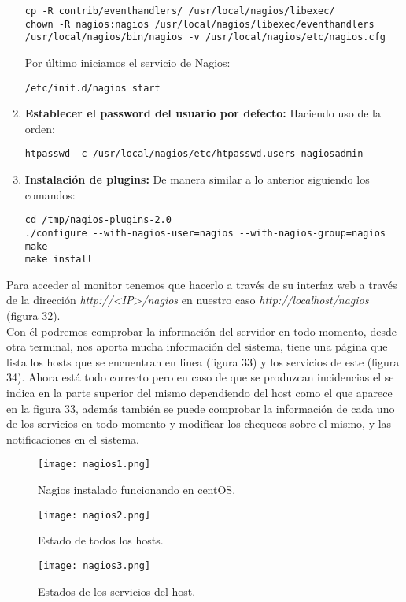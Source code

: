 \documentclass[a4paper, 11pt]{article} %
\begin{document}
\begin{enumerate}
\begin{verbatim}
cp -R contrib/eventhandlers/ /usr/local/nagios/libexec/
chown -R nagios:nagios /usr/local/nagios/libexec/eventhandlers
/usr/local/nagios/bin/nagios -v /usr/local/nagios/etc/nagios.cfg
\end{verbatim}
Por último iniciamos el servicio de Nagios:
\begin{verbatim}
/etc/init.d/nagios start
\end{verbatim}
\item \textbf{Establecer el password del usuario por defecto:} Haciendo uso de la orden:
\begin{verbatim}
htpasswd –c /usr/local/nagios/etc/htpasswd.users nagiosadmin
\end{verbatim}
\item \textbf{Instalación de plugins:} De manera similar a lo anterior siguiendo los comandos:
\begin{verbatim}
cd /tmp/nagios-plugins-2.0
./configure --with-nagios-user=nagios --with-nagios-group=nagios
make
make install
\end{verbatim}
\end{enumerate}
Para acceder al monitor tenemos que hacerlo a través de su interfaz web a través de la dirección \textit{http://<IP>/nagios} en nuestro caso \textit{http://localhost/nagios} (figura 32).\\
Con él podremos comprobar la información del servidor en todo momento, desde otra terminal, nos aporta mucha información del sistema, tiene una página que lista los hosts que se encuentran en linea (figura 33) y los servicios de este (figura 34). Ahora está todo correcto pero en caso de que se produzcan incidencias el se indica en la parte superior del mismo dependiendo del host como el que aparece en la figura 33, además también se puede comprobar la información de cada uno de los servicios en todo momento y modificar los chequeos sobre el mismo, y las notificaciones en el sistema.
\begin{figure}[H]
\centering 
\texttt{[image: nagios1.png]} 
\caption{Nagios instalado funcionando en centOS.} 
\label{contexto:figura} 
\end{figure}
 \begin{figure}[H]
\centering 
\texttt{[image: nagios2.png]} 
\caption{Estado de todos los hosts.} 
\label{contexto:figura} 
\end{figure}
\begin{figure}[H]
\centering 
\texttt{[image: nagios3.png]} 
\caption{Estados de los servicios del host.} 
\label{contexto:figura} 
\end{figure}
\end{document}
